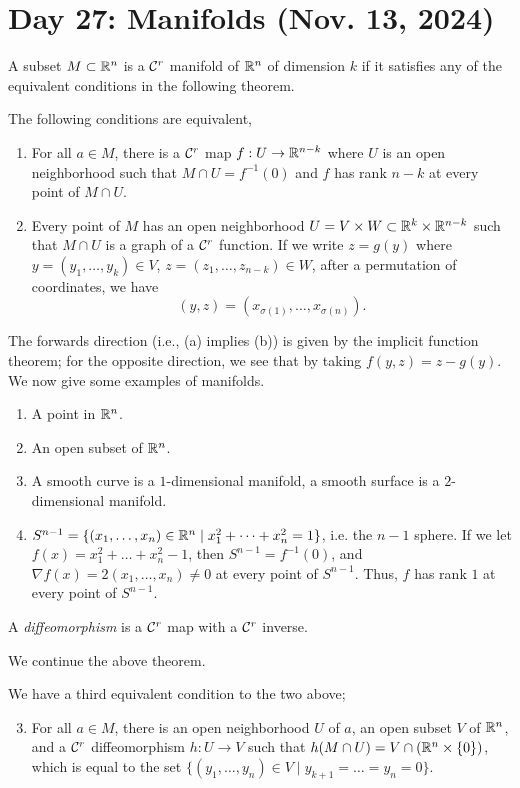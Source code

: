 \section{Day 27: Manifolds (Nov. 13, 2024)}
A subset $M \subset \mathbb R^n$ is a $\mathcal C^r$ manifold of $\mathbb R^n$ of dimension $k$ if it satisfies any of the equivalent conditions in the following theorem.
\begin{simplethm}
    The following conditions are equivalent,
    \begin{enumerate}[label=(\alph*)]
        \item For all $a \in M$, there is a $\mathcal C^r$ map $f : U \to \mathbb R^{n-k}$ where $U$ is an open neighborhood such that $M \cap U = f^{-1}(0)$ and $f$ has rank $n-k$ at every point of $M \cap U$.
        \item Every point of $M$ has an open neighborhood $U = V \times W \subset \mathbb R^{k} \times \mathbb R^{n-k}$ such that $M \cap U$ is a graph of a $\mathcal C^r$ function. If we write $z = g(y)$ where $y = (y_1, \dots, y_k) \in V$, $z = (z_1, \dots, z_{n-k}) \in W$, after a permutation of coordinates, we have
        \[ (y, z) = (x_{\sigma(1)}, \dots, x_{\sigma(n)}). \]
    \end{enumerate}
\end{simplethm}
\noindent The forwards direction (i.e., (a) implies (b)) is given by the implicit function theorem; for the opposite direction, we see that by taking $f(y, z) = z - g(y)$.
\medskip\newline
We now give some examples of manifolds.
\begin{enumerate}[label=(\alph*)]
    \item A point in $\mathbb R^n$.
    \item An open subset of $\mathbb R^n$.
    \item A smooth curve is a $1$-dimensional manifold, a smooth surface is a $2$-dimensional manifold.
    \item $S^{n-1} = \{(x_1, \dots, x_n) \in \mathbb R^n \mid x_1^2 + \dots + x_n^2 = 1\}$, i.e. the $n-1$ sphere. If we let $f(x) = x_1^2 + \dots + x_n^2 - 1$, then $S^{n-1} = f^{-1}({0})$, and $\nabla f(x) = 2(x_1, \dots, x_n) \neq 0$ at every point of $S^{n-1}$. Thus, $f$ has rank $1$ at every point of $S^{n-1}$.
\end{enumerate}
\begin{definition}
    A \textit{diffeomorphism} is a $\mathcal C^r$ map with a $\mathcal C^r$ inverse.
\end{definition}
\noindent We continue the above theorem.
\begin{simplethm}
    We have a third equivalent condition to the two above;
    \begin{enumerate}[label=(\alph*)]
        \setcounter{enumi}{2}
        \item For all $a \in M$, there is an open neighborhood $U$ of $a$, an open subset $V$ of $\mathbb R^n$, and a $\mathcal C^r$ diffeomorphism $h : U \to V$ such that $h(M \cap U) = V \cap (\mathbb R^n \times \{0\})$, which is equal to the set $\{(y_1, \dots, y_n) \in V \mid y_{k+1} = \dots = y_n = 0 \}$.
    \end{enumerate}
\end{simplethm}
